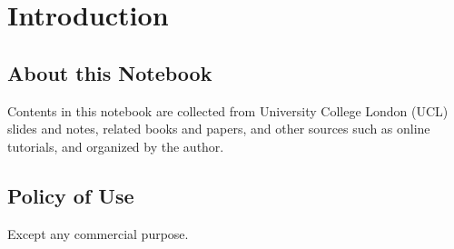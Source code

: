 
\chapter{Introduction}
\label{chapter1}

\section{About this Notebook}
\label{section1.1}

Contents in this notebook are collected from University College London (UCL) slides and notes, related books and papers, and other sources such as online tutorials, and organized by the author.

\section{Policy of Use}
\label{section1.2}

Except any commercial purpose.
